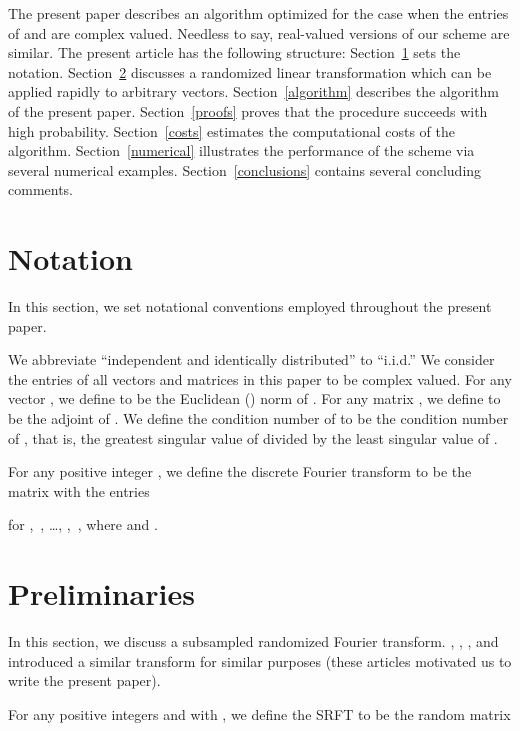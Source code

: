 \documentclass[letterpaper,12pt]{article}
\begin{document}
The present paper describes an algorithm optimized for the case
when the entries of  and  are complex valued.
Needless to say, real-valued versions of our scheme are similar.
The present article has the following structure:
Section~\ref{notation} sets the notation.
Section~\ref{prelims} discusses a randomized linear transformation
which can be applied rapidly to arbitrary vectors.
Section~\ref{algorithm} describes the algorithm of the present paper.
Section~\ref{proofs} proves that the procedure succeeds with high probability.
Section~\ref{costs} estimates the computational costs of the algorithm.
Section~\ref{numerical} illustrates the performance of the scheme
via several numerical examples.
Section~\ref{conclusions} contains several concluding comments.



\section{Notation}
\label{notation}


In this section, we set notational conventions employed
throughout the present paper.

We abbreviate ``independent and identically distributed'' to ``i.i.d.''
We consider the entries of all vectors and matrices in this paper
to be complex valued.
For any vector , we define  to be the Euclidean () norm of .
For any matrix , we define  to be the adjoint of .
We define the condition number of  to be the  condition number of ,
that is, the greatest singular value of  divided
by the least singular value of .

For any positive integer ,
we define the discrete Fourier transform  to be the matrix
with the entries

for ,~, \dots, ,~, where  and .



\section{Preliminaries}
\label{prelims}

In this section, we discuss a subsampled randomized Fourier transform.
\cite{ailon-chazelle}, \cite{drineas-mahoney-muthukrishnan-sarlos},
\cite{sarlos3}, and~\cite{sarlos4} introduced a similar transform
for similar purposes (these articles motivated us to write the present paper).

For any positive integers  and  with ,
we define the  SRFT to be the random matrix
\end{document}
